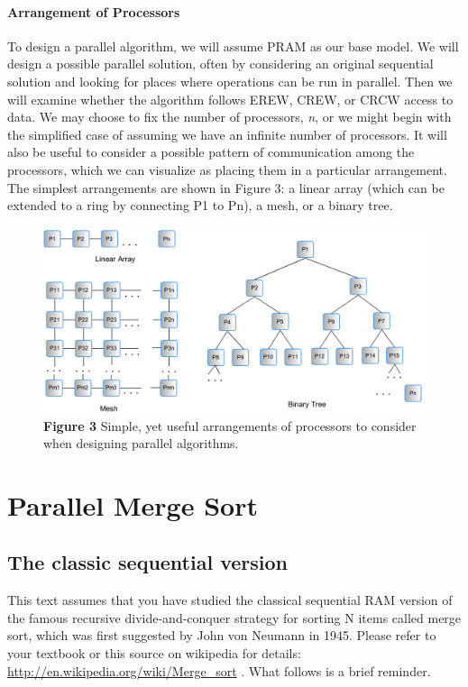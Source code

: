 \documentclass[letterpaper,10pt,openany,oneside]{sphinxmanual}
\begin{document}
\subsubsection{Arrangement of Processors}
\label{ParallelMachineModels/ParallelMachineModels:arrangement-of-processors}
To design a parallel algorithm, we will assume PRAM as our base model. We will design a possible parallel solution, often by considering an original sequential solution and looking for places where operations can be run in parallel. Then we will examine whether the algorithm follows EREW, CREW, or CRCW access to data.  We may choose to fix the number of processors, \emph{n}, or we might begin with the simplified case of assuming we have an infinite number of processors. It will also be useful to consider a possible pattern of communication among the processors, which we can visualize as placing them in a particular arrangement.  The simplest arrangements are shown in Figure 3: a linear array (which can be extended to a ring by connecting P1 to Pn), a mesh, or a binary tree.
\begin{figure}[htbp]
\centering
\capstart

\includegraphics{Figure3.png}
\caption{\textbf{Figure 3} Simple, yet useful arrangements of processors to consider when designing parallel algorithms.}\end{figure}


\chapter{Parallel Merge Sort}
\label{MergeSort/MergeSort:parallel-merge-sort}\label{MergeSort/MergeSort::doc}

\section{The classic sequential version}
\label{MergeSort/MergeSort:the-classic-sequential-version}
This text assumes that you have studied the classical sequential RAM version of the famous recursive divide-and-conquer strategy for sorting N items called merge sort, which was first suggested by John von Neumann in 1945.  Please refer to your textbook or this source on wikipedia for details:  \href{http://en.wikipedia.org/wiki/Merge\_sort}{http://en.wikipedia.org/wiki/Merge\_sort} .  What follows is a brief reminder.
\end{document}
